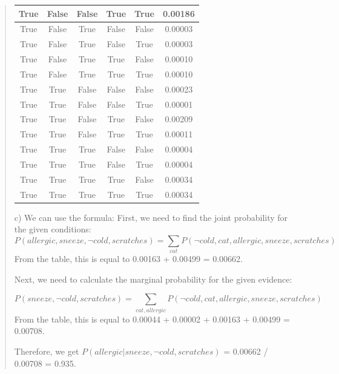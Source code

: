 \documentclass{article}
\theoremstyle{definition}
\newcommand{\<}{\langle}
\renewcommand{\>}{\rangle}
\begin{document}
\begin{enumerate}[label=\textbf{\Alph*}]
\begin{quote}
\begin{table}[h ]
\begin{tabular}{|c|c|c|c|c|c|}
        True & False & False & True & True & 0.00186 \\ \hline
        True & False & True & False & False & 0.00003 \\ \hline
        True & False & True & False & True & 0.00003 \\ \hline
        True & False & True & True & False & 0.00010 \\ \hline
        True & False & True & True & True & 0.00010 \\ \hline
        True & True & False & False & False & 0.00023 \\ \hline
        True & True & False & False & True & 0.00001 \\ \hline
        True & True & False & True & False & 0.00209 \\ \hline
        True & True & False & True & True & 0.00011 \\ \hline
        True & True & True & False & False & 0.00004 \\ \hline
        True & True & True & False & True & 0.00004 \\ \hline
        True & True & True & True & False & 0.00034 \\ \hline
        True & True & True & True & True & 0.00034 \\ \hline
        \end{tabular}
        \end{table}
        \newpage
        c) We can use the formula: 
        First, we need to find the joint probability for the given conditions:
        \begin{equation*}
        P(allergic, sneeze, \neg cold, scratches) = \sum_{cat} P(\neg cold, cat, allergic, sneeze, scratches)
        \end{equation*}
        From the table, this is equal to 0.00163 + 0.00499 = 0.00662.
        
        Next, we need to calculate the marginal probability for the given evidence:
        
        \begin{equation*}
        P(sneeze, \neg cold, scratches) = \sum_{cat, allergic} P(\neg cold, cat, allergic, sneeze, scratches)
        \end{equation*}
        From the table, this is equal to 0.00044 + 0.00002 + 0.00163 + 0.00499 = 0.00708.
        
        Therefore, we get $P(allergic | sneeze, ¬cold, scratches)$ = 0.00662 / 0.00708 = 0.935.
    \end{quote}


\end{enumerate}
\end{document}

